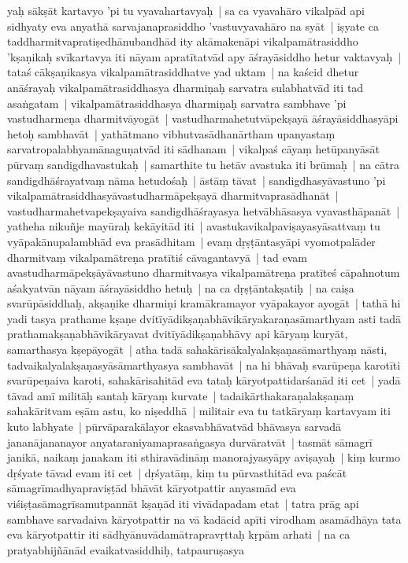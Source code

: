 \documentclass[article,a4paper]{memoir}
\begin{document}
yaḥ sā\-kṣā\-t kartavyo 'pi tu vyavahartavyaḥ | sa ca vyavahā\-ro vikalpā\-d api sidhyaty eva anyathā\- sarvajanaprasiddho 'vastuvyavahā\-ro na syā\-t | iṣyate ca taddharmitvapratiṣedhā\-nubandhā\-d ity akā\-makenā\-pi vikalpamā\-trasiddho 'kṣaṇikaḥ svī\-kartavya iti nā\-yam apratī\-tatvā\-d apy ā\-śrayā\-siddho hetur vaktavyaḥ | tataś cā\-kṣaṇikasya vikalpamā\-trasiddhatve yad uktam | \label{thakur75-89.17} na kaścid dhetur anā\-śrayaḥ vikalpamā\-trasiddhasya dharmiṇaḥ sarvatra sulabhatvā\-d iti tad asaṅgatam | vikalpamā\-trasiddhasya dharmiṇaḥ sarvatra sambhave 'pi vastudharmeṇa dharmitvā\-yogā\-t | vastudharmahetutvā\-pekṣayā\- ā\-śrayā\-siddhasyā\-pi hetoḥ sambhavā\-t | \label{thakur75-89.20} yathā\-tmano vibhutvasā\-dhanā\-rtham upanyastaṃ sarvatropalabhyamā\-naguṇatvā\-d iti sā\-dhanam | vikalpaś cā\-yaṃ hetū\-panyā\-sā\-t pū\-rvaṃ sandigdhavastukaḥ | samarthite tu hetā\-v avastuka iti brū\-maḥ | \label{thakur75-89.23} na cā\-tra sandigdhā\-śrayatvaṃ nā\-ma hetudośaḥ | ā\-stā\-ṃ tā\-vat | sandigdhasyā\-vastuno 'pi vikalpamā\-trasiddhasyā\-vastudharmā\-pekṣayā\- dharmitvaprasā\-dhanā\-t | vastudharmahetvapekṣayaiva sandigdhā\-śrayasya hetvā\-bhā\-sasya vyavasthā\-panā\-t | yatheha nikuñje mayū\-raḥ kekā\-yitā\-d iti | avastukavikalpaviṣayasyā\-sattvaṃ tu vyā\-pakā\-nupalambhā\-d eva prasā\-dhitam | evaṃ dṛṣṭā\-ntasyā\-pi vyomotpalā\-der dharmitvaṃ vikalpamā\-treṇa pratī\-tiś cā\-vagantavyā\- | tad evam avastudharmā\-pekṣā\-yā\-vastuno dharmitvasya vikalpamā\-treṇa pratī\-teś cā\-pahnotum aśakyatvā\-n nā\-yam ā\-śrayā\-siddho hetuḥ | na ca dṛṣṭā\-ntakṣatiḥ | \label{thakur75-89.30} na caiṣa svarū\-pā\-siddhaḥ, akṣaṇike dharmiṇi kramā\-kramayor vyā\-pakayor ayogā\-t | tathā\- hi yadi tasya prathame kṣaṇe dvitī\-yā\-dikṣaṇabhā\-vikā\-ryakaraṇasā\-marthyam asti tadā\- prathamakṣaṇabhā\-vikā\-ryavat dvitī\-yā\-dikṣaṇabhā\-vy api kā\-ryaṃ kuryā\-t, samarthasya kṣepā\-yogā\-t | \label{thakur75-90.2} atha tadā\- sahakā\-risā\-kalyalakṣaṇasā\-marthyaṃ nā\-sti, tadvaikalyalakṣaṇasyā\-sā\-marthyasya sambhavā\-t | na hi bhā\-vaḥ svarū\-peṇa karotī\-ti svarū\-peṇaiva karoti, sahakā\-risahitā\-d eva tataḥ kā\-ryotpattidarśanā\-d iti cet | \label{thakur75-90.4} yadā\- tā\-vad amī\- militā\-ḥ santaḥ kā\-ryaṃ kurvate | tadaikā\-rthakaraṇalakṣaṇaṃ sahakā\-ritvam eṣā\-m astu, ko niṣeddhā\- | militair eva tu tatkā\-ryaṃ kartavyam iti kuto labhyate | pū\-rvā\-parakā\-layor ekasvabhā\-vatvā\-d bhā\-vasya sarvadā\- jananā\-jananayor anyataraniyamaprasaṅgasya durvā\-ratvā\-t | tasmā\-t sā\-magrī\- janikā\-, naikaṃ janakam iti sthiravā\-dinā\-ṃ manorajyasyā\-py aviṣayaḥ | \label{thakur75-90.9} kiṃ kurmo dṛśyate tā\-vad evam iti cet | dṛśyatā\-ṃ, kiṃ tu pū\-rvasthitā\-d eva paścā\-t sā\-magrī\-madhyapraviṣṭā\-d bhā\-vā\-t kā\-ryotpattir anyasmā\-d eva viśiṣṭasā\-magrī\-samutpannā\-t kṣaṇā\-d iti vivā\-dapadam etat | tatra prā\-g api sambhave sarvadaiva kā\-ryotpattir na vā\- kadā\-cid apī\-ti virodham asamā\-dhā\-ya tata eva kā\-ryotpattir iti sā\-dhyā\-nuvā\-damā\-trapravṛttaḥ kṛpā\-m arhati | \label{thakur75-90.14} na ca pratyabhijñā\-nā\-d evaikatvasiddhiḥ, tatpauruṣasya 
\end{document}

